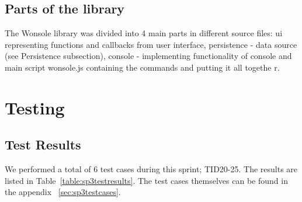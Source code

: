 \subsection{Parts of the library}
The Wonsole library was divided into 4 main parts in different source files: ui
representing functions and callbacks from user interface, persistence - data
source (see Persistence subsection), console - implementing functionality of
console and main script wonsole.js containing the commands and putting it all
togethe
r.

\section{Testing}
\subsection{Test Results}
We performed a total of 6 test cases during this sprint; TID20-25. The results are listed in Table~\ref{table:sp3testresults}. The test cases themselves can be found in the appendix ~\ref{sec:sp3testcases}.

